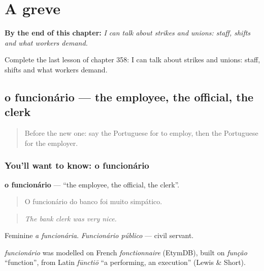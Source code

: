 
\chapter{A greve}
\label{ch:pt-a-greve}

\begin{chapteropening}
\textbf{By the end of this chapter:} \emph{I can talk about strikes and unions: staff, shifts and what workers demand.}

Complete the last lesson of chapter 358: I can talk about strikes and unions: staff, shifts and what workers demand.
\end{chapteropening}

\section[o funcionário]{o funcionário — the employee, the official, the clerk}

\label{lesson:PT-C358-funcionario}



\begin{quote}
Before the new one: say the Portuguese for to employ, then the Portuguese for the employer.
\end{quote}

\subsection*{You'll want to know: o funcionário}
\textbf{o funcionário} — \textquotedblleft{}the employee, the official, the clerk\textquotedblright{}.

\begin{quote}
O funcionário do banco foi muito simpático.
\end{quote}

\begin{quote}
\emph{The bank clerk was very nice.}
\end{quote}

Feminine \emph{a funcionária}. \emph{Funcionário público} — civil servant.

\begin{cousinweb}
\emph{funcionário} was modelled on French \emph{fonctionnaire} (EtymDB), built on \emph{função} \textquotedblleft{}function\textquotedblright{}, from Latin \emph{fūnctiō} \textquotedblleft{}a performing, an execution\textquotedblright{} (Lewis \& Short).
\end{cousinweb}

